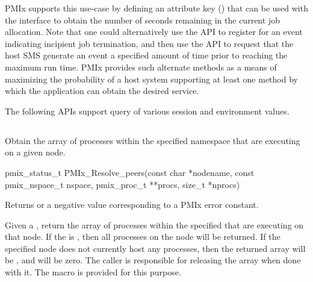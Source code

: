 \ac{PMIx} supports this use-case by defining an attribute key () that can be used with the  interface to obtain the number of seconds remaining in the current job allocation. Note that one could alternatively use the  \ac{API} to register for an event indicating incipient job termination, and then use the  \ac{API} to request that the host \ac{SMS} generate an event a specified amount of time prior to reaching the maximum run time. \ac{PMIx} provides such alternate methods as a means of maximizing the probability of a host system supporting at least one method by which the application can obtain the desired service.

The following \acp{API} support query of various session and environment values.

\subsection{}

\summary

Obtain the array of processes within the specified namespace that are executing on a given node.

\format

\cspecificstart
\begin{codepar}
pmix_status_t
PMIx_Resolve_peers(const char *nodename,
                   const pmix_nspace_t nspace,
                   pmix_proc_t **procs, size_t *nprocs)
\end{codepar}
\cspecificend

\begin{arglist}
\end{arglist}

Returns  or a negative value corresponding to a PMIx error constant.

\descr

Given a , return the array of processes within the specified 
that are executing on that node.
If the  is , then all processes on the node will be returned.
If the specified node does not currently host any processes, then the returned array will be , and  will be zero.
The caller is responsible for releasing the  array when done with it.
The  macro is provided for this purpose.

